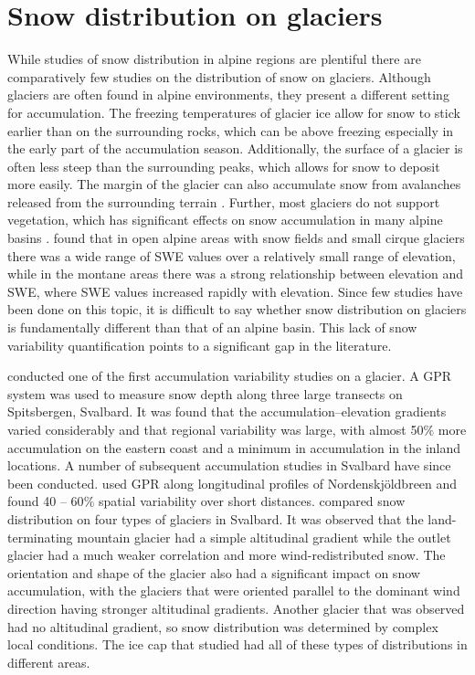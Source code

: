 \documentclass{sfuthesis}
\begin{document}
\section{Snow distribution on glaciers}
While studies of snow distribution in alpine regions are plentiful \citep[and sources within]{Clark2011} there are comparatively few studies on the distribution of snow on glaciers. Although glaciers are often found in alpine environments, they present a different setting for accumulation. The freezing temperatures of glacier ice allow for snow to stick earlier than on the surrounding rocks, which can be above freezing especially in the early part of the accumulation season. Additionally, the surface of a glacier is often less steep than the surrounding peaks, which allows for snow to deposit more easily. The margin of the glacier can also accumulate snow from avalanches released from the surrounding terrain \citep{Bloschl1991, Mott2008}. Further, most glaciers do not support vegetation, which has significant effects on snow accumulation in many alpine basins \citep{Pomeroy1999}. \cite{Alford1985} found that in open alpine areas with snow fields and small cirque glaciers there was a wide range of SWE values over a relatively small range of elevation, while in the montane areas there was a strong relationship between elevation and SWE, where SWE values increased rapidly with elevation. Since few studies have been done on this topic, it is difficult to say whether snow distribution on glaciers is fundamentally different than that of an alpine basin. This lack of snow variability quantification points to a significant gap in the literature.

\cite{Winther1998} conducted one of the first accumulation variability studies on a glacier. A GPR system was used to measure snow depth along three large transects on Spitsbergen, Svalbard. It was found that the accumulation--elevation gradients varied considerably and that regional variability was large, with almost 50$\%$ more accumulation on the eastern coast and a minimum in accumulation in the inland locations. A number of subsequent accumulation studies in Svalbard have since been conducted. \cite{Palli2002} used GPR along longitudinal profiles of Nordenskj\"{o}ldbreen and found 40 -- 60$\%$ spatial variability over short distances. \cite{Grabiec2011} compared snow distribution on four types of glaciers in Svalbard. It was observed that the land-terminating mountain glacier had a simple altitudinal gradient while the outlet glacier had a much weaker correlation and more wind-redistributed snow. The orientation and shape of the glacier also had a significant impact on snow accumulation, with the glaciers that were oriented parallel to the dominant wind direction having stronger altitudinal gradients. Another glacier that was observed had no altitudinal gradient, so snow distribution was determined by complex local conditions. The ice cap that \cite{Grabiec2011} studied had all of these types of distributions in different areas.
\end{document}
